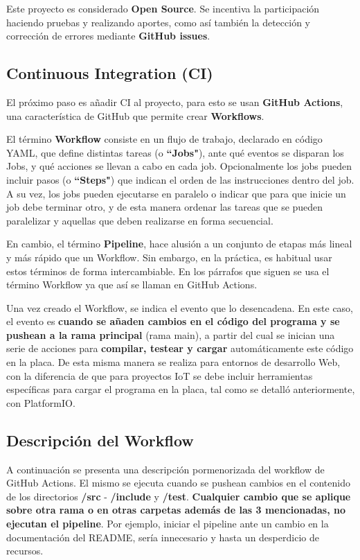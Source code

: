 Este proyecto es considerado \textbf{Open Source}. Se incentiva la participación haciendo pruebas y realizando aportes, como así también la detección y corrección de errores mediante \textbf{GitHub issues}. 

\subsection{Continuous Integration (CI)}
El próximo paso es añadir CI al proyecto, para esto se usan \textbf{GitHub Actions}, una característica de GitHub que permite crear \textbf{Workflows}.

El término \textbf{Workflow} consiste en un flujo de trabajo, declarado en código YAML, que define distintas tareas (o \textbf{``Jobs"}), ante qué eventos se disparan los Jobs, y qué acciones se llevan a cabo en cada job. Opcionalmente los jobs pueden incluir pasos (o \textbf{``Steps"}) que indican el orden de las instrucciones dentro del job. A su vez, los jobs pueden ejecutarse en paralelo o indicar que para que inicie un job debe terminar otro, y de esta manera ordenar las tareas que se pueden paralelizar y aquellas que deben realizarse en forma secuencial.

En cambio, el término \textbf{Pipeline}, hace alusión a un conjunto de etapas más lineal y más rápido que un Workflow. Sin embargo, en la práctica, es habitual usar estos términos de forma intercambiable. En los párrafos que siguen se usa el término Workflow ya que así se llaman en GitHub Actions.

Una vez creado el Workflow, se indica el evento que lo desencadena. En este caso, el evento es \textbf{cuando se añaden cambios en el código del programa y se pushean a la rama principal} (rama main), a partir del cual se inician una serie de acciones para \textbf{compilar, testear y cargar} automáticamente este código en la placa. De esta misma manera se realiza para entornos de desarrollo Web, con la diferencia de que para proyectos IoT se debe incluir herramientas específicas para cargar el programa en la placa, tal como se detalló anteriormente, con PlatformIO.

\subsection{Descripción del Workflow}
A continuación se presenta una descripción pormenorizada del workflow de GitHub Actions. El mismo se ejecuta cuando se pushean cambios en el contenido de los directorios \textbf{/src} - \textbf{/include} y \textbf{/test}. \textbf{Cualquier cambio que se aplique sobre otra rama o en otras carpetas además de las 3 mencionadas, no ejecutan el pipeline}. Por ejemplo, iniciar el pipeline ante un cambio en la documentación del README, sería innecesario y hasta un desperdicio de recursos. 


